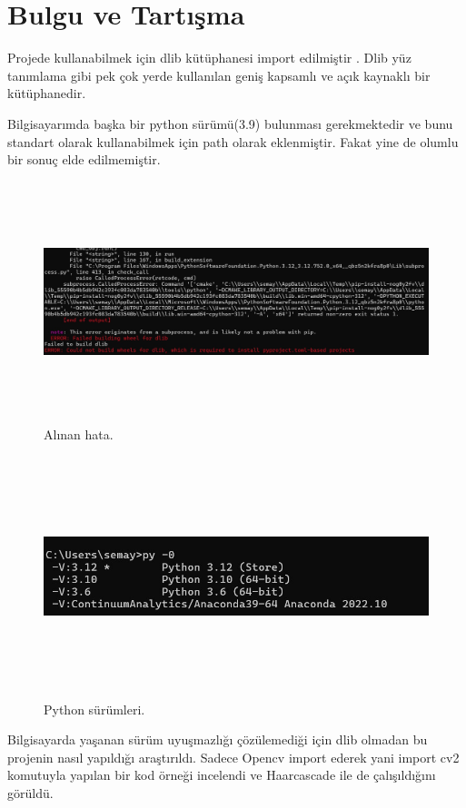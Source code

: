 \documentclass[12pt, a4paper]{article}
\begin{document}
	\section{Bulgu ve Tartışma}
	Projede kullanabilmek için dlib kütüphanesi import edilmiştir . Dlib yüz tanımlama gibi pek çok yerde kullanılan geniş kapsamlı ve açık kaynaklı bir kütüphanedir.\par Bilgisayarımda başka bir python sürümü(3.9) bulunması gerekmektedir ve bunu standart olarak kullanabilmek için path olarak eklenmiştir. Fakat yine de olumlu bir sonuç elde edilmemiştir. \begin{figure}[!h]
		\centering
		\includegraphics[width=17cm, height=7cm, keepaspectratio]{error.jpg}
		\caption{Alınan hata.} 
	\end{figure}\par \begin{figure}[!h]
		\centering
		\includegraphics[width=17cm, height=7cm, keepaspectratio]{psurumu.jpg}
		\caption{Python sürümleri.} 
	\end{figure}\par
	Bilgisayarda yaşanan sürüm uyuşmazlığı çözülemediği için dlib olmadan bu projenin nasıl yapıldığı araştırıldı. Sadece Opencv import ederek yani import cv2 komutuyla yapılan bir kod örneği incelendi ve Haarcascade ile de çalışıldığını görüldü.\newline
\end{document}
